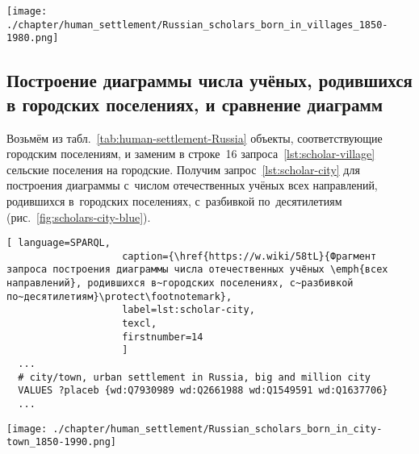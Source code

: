 \begin{figure*}
    \texttt{[image: ./chapter/human\_settlement/Russian\_scholars\_born\_in\_villages\_1850-1980.png]}%
	\label{fig:scholars-village-blue}
    \caption[Количество отечественных учёных, родившихся в сёлах, 2022 год.]{Количество российских и советских учёных \emph{всех направлений}, родившихся в сельских поселениях в 1850--1980-е годы}%
\end{figure*} 






\subsection{Построение диаграммы числа учёных, родившихся в городских поселениях, и сравнение диаграмм}

Возьмём из табл.~\ref{tab:human-settlement-Russia} объекты, соответствующие городским поселениям, 
и заменим в строке~16 запроса~\ref{lst:scholar-village} сельские поселения на городские. 
Получим запрос~\ref{lst:scholar-city} для построения диаграммы 
с~числом отечественных учёных всех направлений, родившихся в~городских поселениях, 
с~разбивкой по~десятилетиям (рис.~\ref{fig:scholars-city-blue}). 


\begin{lstlisting}[ language=SPARQL, 
                    caption={\href{https://w.wiki/58tL}{Фрагмент запроса построения диаграммы числа отечественных учёных \emph{всех направлений}, родившихся в~городских поселениях, с~разбивкой по~десятилетиям}\protect\footnotemark},
                    label=lst:scholar-city,
                    texcl, 
                    firstnumber=14
                    ]
  ...
  # city/town, urban settlement in Russia, big and million city
  VALUES ?placeb {wd:Q7930989 wd:Q2661988 wd:Q1549591 wd:Q1637706}
  ...
\end{lstlisting}%


\begin{figure*}
    \texttt{[image: ./chapter/human\_settlement/Russian\_scholars\_born\_in\_city-town\_1850-1990.png]}%
	\label{fig:scholars-city-blue}
    \caption[Количество отечественных учёных, родившихся в городах, 2022 год.]{Количество российских и советских учёных \emph{всех направлений}, родившихся в городских поселениях в 1850--1990-е годы}%
\end{figure*} 


